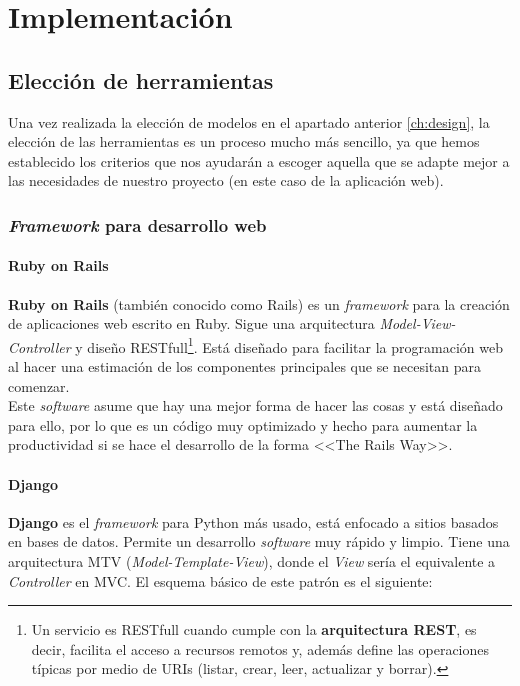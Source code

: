 \chapter{Implementación}

\section{Elección de herramientas} \label{sec:tools}
Una vez realizada la elección de modelos en el apartado anterior \ref{ch:design}, la
elección de las herramientas es un proceso mucho más sencillo, ya que hemos establecido
los criterios que nos ayudarán a escoger aquella que se adapte mejor a las necesidades
de nuestro proyecto (en este caso de la aplicación web).

\subsection{\textit{Framework} para desarrollo web}

    \subsubsection{Ruby on Rails}
    \textbf{Ruby on Rails} (también conocido como Rails) \cite{ruby-on-rails} es un
    \textit{framework} para la creación de aplicaciones web escrito en Ruby. Sigue una
    arquitectura \textit{Model-View-Controller} y diseño RESTfull\footnote{Un servicio
    es RESTfull cuando cumple con la \textbf{arquitectura REST}, es decir, facilita el
    acceso a recursos remotos y, además define las operaciones típicas por medio de URIs
    (listar, crear, leer, actualizar y borrar).}. Está diseñado para facilitar la
    programación web al hacer una estimación de los componentes principales que se
    necesitan para comenzar.\\

    Este \textit{software} asume que hay una mejor forma de hacer las cosas y está diseñado
    para ello, por lo que es un código muy optimizado y hecho para aumentar la productividad
    si se hace el desarrollo de la forma <<The Rails Way>>.

    \subsubsection{Django}
    \textbf{Django} \cite{django} es el \textit{framework} para Python más usado, está
    enfocado a sitios basados en bases de datos. Permite un desarrollo \textit{software}
    muy rápido y limpio. Tiene una arquitectura MTV (\textit{Model-Template-View}), donde el
    \textit{View} sería el equivalente a \textit{Controller} en MVC. El esquema básico de este
    patrón es el siguiente:

